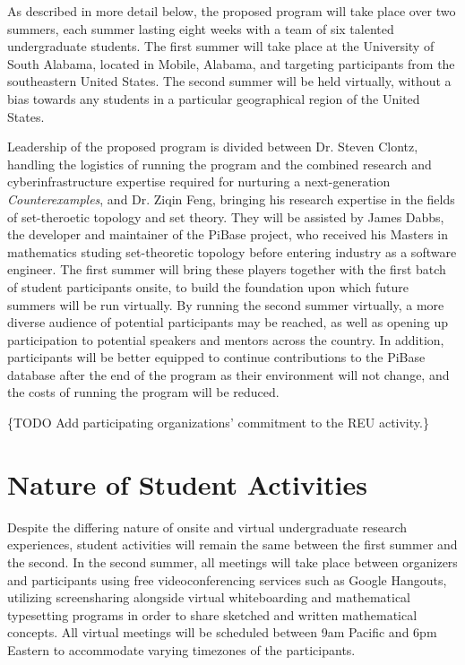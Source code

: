   As described in more detail below, the proposed program will take place
  over two summers, each summer lasting eight weeks
  with a team of six talented undergraduate
  students. The first summer will take place at the University of South
  Alabama, located in Mobile, Alabama, and targeting participants from
  the southeastern United States. The second summer will be held
  virtually, without a bias towards any students in a particular geographical
  region of the United States.

  Leadership of the proposed program is divided between Dr. Steven Clontz,
  handling the logistics of running the program and the combined
  research and cyberinfrastructure
  expertise required for nurturing a next-generation \textit{Counterexamples},
  and Dr. Ziqin Feng, bringing his research expertise in the fields of set-theroetic
  topology and set theory. They will be assisted by James Dabbs, the
  developer and maintainer of the PiBase project, who received his Masters
  in mathematics studing set-theoretic topology before entering industry as
  a software engineer. The first summer will bring these players together
  with the first batch of student participants onsite, to build the foundation
  upon which future summers will be run virtually. By running the second
  summer virtually, a more diverse audience of potential participants may
  be reached, as well as opening up participation to potential speakers and
  mentors across the country. In addition, participants will be better equipped
  to continue contributions
  to the PiBase database after the end of the program as their environment
  will not change, and the costs of running the program will be reduced.

  \{TODO Add participating organizations'
  commitment to the REU activity.\}

\section{Nature of Student Activities}

Despite the differing nature of onsite and virtual undergraduate research
experiences, student activities will remain the same between the first summer
and the second. In the second summer, all meetings will take place
between organizers and participants using free videoconferencing services
such as Google Hangouts, utilizing screensharing alongside virtual whiteboarding
and mathematical typesetting programs in order to share sketched and written
mathematical concepts. All virtual meetings will be scheduled between
9am Pacific and 6pm Eastern to accommodate varying timezones of the participants.

